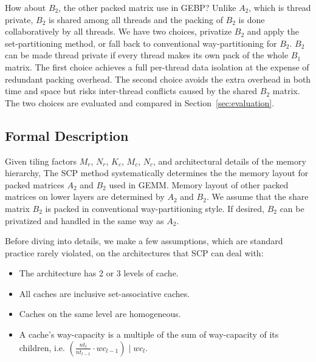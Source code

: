 How about $B_2$, the other packed matrix use in GEBP?
Unlike $A_2$, which is thread private,
$B_2$ is shared among all threads and
the packing of $B_2$ is done collaboratively by all threads.
We have two choices, privatize $B_2$ and apply the set-partitioning method,
or fall back to conventional way-partitioning for $B_2$.
$B_2$ can be made thread private if every thread makes
its own pack of the whole $B_1$ matrix.
The first choice achieves a full per-thread data isolation
at the expense of redundant packing overhead.
The second choice avoids the extra overhead in both time and space
but risks inter-thread conflicts caused by the shared $B_2$ matrix.
The two choices are evaluated and compared in Section~\ref{sec:evaluation}.

\subsection{Formal Description}\label{subsec:formal}
Given tiling factors $M_r$, $N_r$, $K_c$, $M_c$, $N_c$,
and architectural details of the memory hierarchy,
The SCP method systematically determines the
the memory layout for packed matrices $A_2$ and $B_2$ used in GEMM.
Memory layout of other packed matrices on lower layers are
determined by $A_2$ and $B_2$.
We assume that the share matrix $B_2$ is packed
in conventional way-partitioning style.
If desired, $B_2$ can be privatized and handled in the same way as $A_2$.

Before diving into details, we make a few assumptions,
which are standard practice rarely violated,
on the architectures that SCP can deal with:
\begin{itemize}
\item The architecture has 2 or 3 levels of cache. %
\item All caches are inclusive set-associative caches. %
\item Caches on the same level are homogeneous. %
\item A cache's way-capacity is a multiple of the sum of way-capacity of its children,
i.e. $(\frac{nt_l}{nt_{l-1}} \cdot wc_{l-1}) \mid wc_l$.
\end{itemize}

